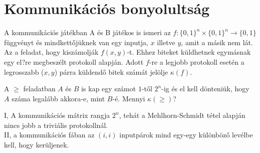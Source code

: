 \section{Kommunik\'aci\'os bonyolults\'ag}

 A kommunik\'aci\'os j\'at\'ekban A \'es B játékos is ismeri az $f:\{0,1\}^n\times \{0,1\}^n\rightarrow \{0,1\}$ függvényt \'es mindkett\H oj\"uknek van egy inputja, $x$ illetve $y$, amit a másik nem lát. Az a feladat, hogy kisz\'amolj\'ak $f(x,y)$-t. Ehhez biteket küldhetnek egymásnak egy el?re megbeszélt protokoll alapján. Adott $f$-re a legjobb protokoll esetén a legrosszabb ($x,y$) párra k\"uldend\H o bitek sz\'am\'at jel\"olje $\kappa(f)$.

\begin{Exercise}[counter={sorszam}, difficulty=0]
	A $\ge$ feladatban $A$ \'es $B$ is kap egy sz\'amot $1$-t\H ol $2^n$-ig \'es el kell d\"onteni\"uk, hogy $A$ sz\'ama legal\'abb akkora-e, mint $B$-\'e. Mennyi $\kappa(\ge)$?
\end{Exercise}
\begin{Answer}
	I, A kommunik\'aci\'os m\'atrix rangja $2^n$, teh\'at a Mehlhorn-Schmidt t\'etel alapj\'an nincs jobb a trivi\'alis protokolln\'al.\\
	II, a kommunik\'aci\'os f\'aban az $(i,i)$ inputp\'arok mind egy-egy k\"ul\"onb\"oz\H o lev\'elbe kell, hogy ker\"uljenek.
\end{Answer}


